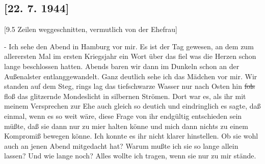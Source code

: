 \subsection{{\color{red} [22. 7. 1944] }}
{\color{red} [9.5 Zeilen weggeschnitten, vermutlich von der Ehefrau] }

- Ich sehe den Abend in Hamburg vor mir.
Es ist der Tag gewesen, an dem zum allerersten Mal im ersten Kriegsjahr ein Wort \"{u}ber das fiel was die Herzen schon lange beschlossen hatten.
Abends baren wir dann im Dunkeln schon an der Au{\ss}enalster entlanggewandelt.
Ganz deutlich sehe ich das M\"{a}dchen vor mir.
Wir standen auf dem Steg, rings lag das tiefschwarze Wasser nur nach Osten hin \st{fols} flo{\ss} das glitzernde Mondeslicht in silbernen Str\"{o}men.
Dort war es, als ihr mit meinem Versprechen zur Ehe auch gleich so deutich und eindringlich es sagte, da{\ss} einmal, wenn es so weit w\"{a}re, diese Frage von ihr endg\"{u}ltig entschieden sein m\"{u}{\ss}te, da{\ss} sie dann nur zu mier halten k\"{o}nne und mich dann nichts zu einem Kompromi{\ss} bewegen k\"{o}nne.
Ich konnte es ihr nicht klarer hinstellen.
Ob sie wohl auch an jenen Abend mitgedacht hat?
Warum mu{\ss}te ich sie so lange allein lassen?
Und wie lange noch?
Alles wollte ich tragen, wenn sie nur zu mir st\"{a}nde.

\clearpage
